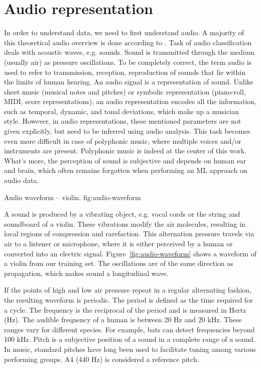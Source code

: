 
\section{Audio representation}
\label{sec:audio-representation}
In order to understand data, we need to first understand audio.
A majority of this theoretical audio overview is done according to \cite{knees2016music}.
Task of audio classification deals with acoustic waves, e.g. sounds. Sound is transmitted through the medium (usually air) as pressure oscillations. To be completely correct, the term audio is used to refer to transmission, reception, reproduction of sounds that lie within the limits of human hearing. An audio signal is a representation of sound. Unlike sheet music (musical notes and pitches) or symbolic representation (piano-roll, MIDI, score representations), an audio representation encodes all the information, such as temporal, dynamic, and tonal deviations, which make up a musician style. However, in audio representations, these mentioned parameters are not given explicitly, but need to be inferred using audio analysis. This task becomes even more difficult in case of polyphonic music, where multiple voices and/or instruments are present. Polyphonic music is indeed at the center of this work. What's more, the perception of sound is subjective and depends on human ear and brain, which often remains forgotten when performing an ML approach on audio data.

			{Audio waveform -- violin.}
			{fig:audio-waveform}

A sound is produced by a vibrating object, e.g. vocal cords or the string and soundboard of a violin.  These vibrations modify the air molecules, resulting in local regions of compression and rarefaction. This alternation pressure travels via air to a listener or microphone, where it is either perceived by a human or converted into an electric signal. Figure~\ref{fig:audio-waveform} shows a waveform of a violin from our training set. The oscillations are of the same direction as propagation, which makes sound a longitudinal wave. 

If the points of high and low air pressure repeat in a regular alternating fashion, the resulting waveform is periodic. The period is defined as the time required for a cycle. The frequency is the reciprocal of the period and is measured in Hertz (Hz). The audible frequency of a human is between 20 Hz and 20 kHz. These ranges vary for different species. For example, bats can detect frequencies beyond 100 kHz. Pitch is a subjective position of a sound in a complete range of a sound. In music, standard pitches have long been used to facilitate tuning among various performing groups. A4 (440 Hz) is considered a reference pitch. 

